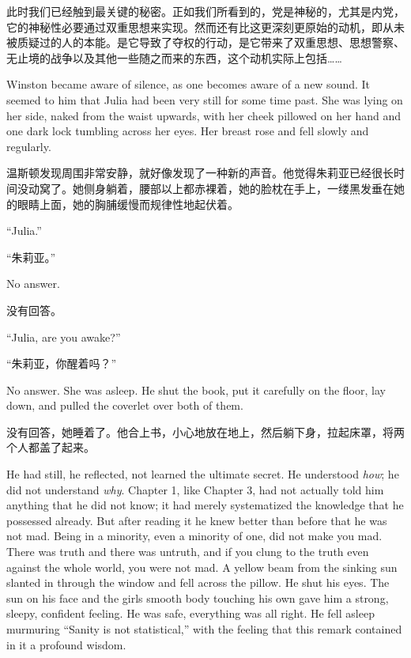 \begin{paracol}{2}
\switchcolumn

此时我们已经触到最关键的秘密。正如我们所看到的，党是神秘的，尤其是内党，它的神秘性必要通过双重思想来实现。然而还有比这更深刻更原始的动机，即从未被质疑过的人的本能。是它导致了夺权的行动，是它带来了双重思想、思想警察、无止境的战争以及其他一些随之而来的东西，这个动机实际上包括\ldots\ldots{}

\switchcolumn*

Winston became aware of silence, as one becomes aware of a new sound. It
seemed to him that Julia had been very still for some time past. She was
lying on her side, naked from the waist upwards, with her cheek pillowed
on her hand and one dark lock tumbling across her eyes. Her breast rose
and fell slowly and regularly.

\switchcolumn

温斯顿发现周围非常安静，就好像发现了一种新的声音。他觉得朱莉亚已经很长时间没动窝了。她侧身躺着，腰部以上都赤裸着，她的脸枕在手上，一缕黑发垂在她的眼睛上面，她的胸脯缓慢而规律性地起伏着。

\switchcolumn*

``Julia.''

\switchcolumn

``朱莉亚。''

\switchcolumn*

No answer.

\switchcolumn

没有回答。

\switchcolumn*

``Julia, are you awake?''

\switchcolumn

``朱莉亚，你醒着吗？''

\switchcolumn*

No answer. She was asleep. He shut the book, put it carefully on the
floor, lay down, and pulled the coverlet over both of them.

\switchcolumn

没有回答，她睡着了。他合上书，小心地放在地上，然后躺下身，拉起床罩，将两个人都盖了起来。

\switchcolumn*

He had still, he reflected, not learned the ultimate secret. He
understood \emph{how}; he did not understand \emph{why}. Chapter 1, like
Chapter 3, had not actually told him anything that he did not know; it
had merely systematized the knowledge that he possessed already. But
after reading it he knew better than before that he was not mad. Being
in a minority, even a minority of one, did not make you mad. There was
truth and there was untruth, and if you clung to the truth even against
the whole world, you were not mad. A yellow beam from the sinking sun
slanted in through the window and fell across the pillow. He shut his
eyes. The sun on his face and the girl\textquotesingle s smooth body
touching his own gave him a strong, sleepy, confident feeling. He was
safe, everything was all right. He fell asleep murmuring ``Sanity is not
statistical,'' with the feeling that this remark contained in it a
profound wisdom.


\end{paracol}
